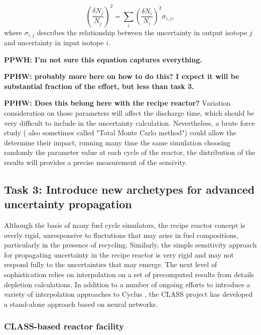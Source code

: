 \documentclass[dvips,12pt]{article}
\newcommand{\unc}[1]
{ \delta #1 }
\newcommand{\uncratio}[1]
{ \left(\frac{\unc{#1}}{#1}\right) }
\newcommand{\uncratiosq}[1]
{ \uncratio{#1}^2 }
\newcommand{\comment}[1]
{{\bfseries \color{red} #1}}
\begin{document}
\begin{equation}
\uncratiosq{N_j} = \sum_i \uncratiosq{N_i} \sigma_{i,j},
\end{equation}
where $\sigma_{i,j}$ describes the relationship
between the uncertainty in output isotope $j$ and
uncertainty in input isotope $i$.

\comment{PPWH: I'm not sure this equation captures
  everything.}

\comment{PPHW: probably more here on how to do
  this?  I expect it will be substantial
  fraction of the effort, but less than task 3.}

\comment{PPHW: Does this belong here with the
  recipe reactor?}  Variation consideration on
those parameters will affect the discharge time,
which should be very difficult to include in the
uncertainty calculation. Nevertheless, a brute
force study ( also sometimes called "Total Monte
Carlo method") could allow the determine their
impact, running many time the same simulation
choosing randomly the parameter value at each
cycle of the reactor, the distribution of the
results will provides a precise measurement of the
sensivity.

\subsection{Task 3: Introduce new archetypes for advanced uncertainty propagation}

Although the basis of many fuel cycle simulators,
the recipe reactor concept is overly rigid,
unresponsive to fluctutions that may arise in fuel
compositions, particularly in the presence of
recycling.  Similarly, the simple sensitivity
approach for propagating uncertainty in the recipe
reactor is very rigid and may not respond fully to
the uncertainties that may emerge.  The next level
of sophistication relies on interpolation on a set
of precomputed results from details depletion
calculations.  In addition to a number of ongoing
efforts to introduce a variety of interpolation
approaches to Cyclus \cite{britelite, cyborg}, the
CLASS project has developed a stand-alone approach
based on neural networks.

\subsubsection{CLASS-based reactor facility}
\end{document}
